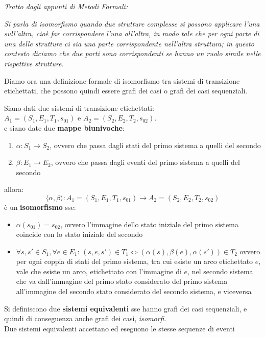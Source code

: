 \begin{shaded}
	\textit{Tratto dagli appunti di Metodi Formali:}\\
	\begin{center}
		\textit{Si parla di isomorfismo quando due strutture complesse si possono
			applicare l'una sull'altra, cioè far corrispondere l'una all'altra, in modo
			tale che per ogni parte di una delle strutture ci sia una parte
			corrispondente nell'altra struttura; in questo contesto diciamo che due
			parti sono corrispondenti se hanno un ruolo simile nelle rispettive
		strutture.}
	\end{center}
	Diamo ora una definizione formale di isomorfismo tra sistemi di transizione
	etichettati, che possono quindi essere grafi dei casi o grafi dei casi
	sequenziali.
	\begin{definizione}
		Siano dati due sistemi di transizione etichettati:\\
		$A_1 = (S_1,E_1,T_1,s_{01})$ e $A_2 = (S_2 , E_2 , T_2 , s_{02})$.\\
		e siano date due \textbf{mappe biunivoche}:
		\begin{enumerate}
			\item $\alpha:S_1\to S_2$, ovvero che passa dagli stati del primo sistema a
			      quelli del secondo
			\item $\beta:E_1\to E_2$, ovvero che passa dagli eventi del primo sistema a
			      quelli del secondo
		\end{enumerate}
		allora:
		\[\langle \alpha,\beta\rangle:A_1= (S_1 , E_1 , T_1 ,s_{01})\to A_2 = (S_2 ,
			E_2 , T_2 , s_{02})\]
			è un \textbf{isomorfismo} sse:
			\begin{itemize}
				\item $\alpha(s_{01})=s_{02}$, ovvero l'immagine dello stato iniziale del
				      primo sistema coincide con lo stato iniziale del secondo
				\item $\forall s,s'\in S_1,\forall e\in E_1:\,(s,e,s')\in T_1
				      \Leftrightarrow (\alpha(s),\beta(e),\alpha(s'))\in T_2$ ovvero per ogni
				      coppia di stati del primo sistema, tra cui esiste un arco etichettato $e$,
				      vale che esiste un arco, etichettato con l'immagine di $e$, nel secondo
				      sistema che va dall'immagine del primo stato considerato del primo sistema
				      all'immagine del secondo stato considerato del secondo sistema, e viceversa
			\end{itemize}
			\end{definizione}
			\begin{definizione}
				Si definiscono due \textbf{sistemi equivalenti} sse hanno grafi dei casi
				sequenziali, e quindi di conseguenza anche grafi dei casi, \emph{isomorfi}.\\
				Due sistemi equivalenti accettano ed eseguono le stesse sequenze di eventi
			\end{definizione}
			\end{shaded}
